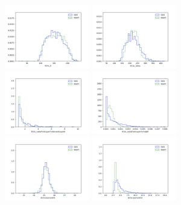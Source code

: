 \begin{figure}
    \centering
    \includegraphics[width=0.33\textwidth]{Images/Calo/GAN_feature_ECAL_E.png}
    \includegraphics[width=0.33\textwidth]{Images/Calo/GAN_feature_ECAL_nHits.png}
    \includegraphics[width=0.33\textwidth]{Images/Calo/GAN_feature_ECAL_ratioFirstLayerToSecondLayerE.png}
    \includegraphics[width=0.33\textwidth]{Images/Calo/GAN_feature_ECAL_ratioFirstLayerToTotalE.png}
    \includegraphics[width=0.33\textwidth]{Images/Calo/GAN_feature_ECALmomentX1.png}
    \includegraphics[width=0.33\textwidth]{Images/Calo/GAN_feature_ECALmomentX2.png}

\end{figure}
